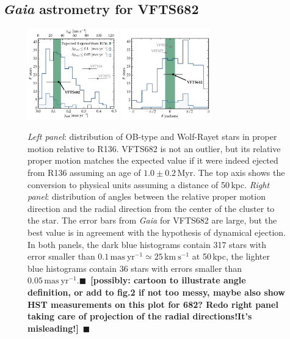 \documentclass[apjl,twocolumn]{emulateapj}
\newcommand{\todo}[1]{{\large $\blacksquare$~\textbf{\color{red}[#1]}}~$\blacksquare$}
\newcommand{\SdM}[1]{{{\color{brown}{#1}}}}
\begin{document}



\subsection{ \emph{Gaia} astrometry for VFTS682\label{data:gaia}}

\begin{figure}[htbp]
  \centering
  \includegraphics[width=0.35\textwidth]{figures/dist_mu_region.pdf}
  \includegraphics[width=0.35\textwidth]{figures/angle}
  \caption{\emph{Left panel}: distribution of OB-type and Wolf-Rayet stars in proper
    motion relative to R136. VFTS682 is not an outlier, but
    its relative proper motion matches the expected value if it were indeed
    ejected from R136 assuming an age of $1.0\pm0.2$\,Myr. The top axis shows the conversion to physical units
    assuming a distance of 50\,kpc. \emph{Right panel}:  distribution of
    angles between the relative proper motion direction and the radial
    direction from the center of the cluster to the star. The error bars from \emph{Gaia} for VFTS682 are large, but
    the best value is in agreement with the hypothesis of dynamical
    ejection. In both
    panels, the dark blue histograms contain 317 
    stars with error smaller than $0.1\,\mathrm{mas \
      yr^{-1}}\simeq25\,\mathrm{km\ s^{-1}}$ at 50\,kpc, the
    lighter blue histograms contain 36 stars with errors smaller than $0.05\,\mathrm{mas \
      yr^{-1}}$.\todo{possibly: cartoon to illustrate angle definition, or add to
    fig.2 if not too messy, maybe also show HST measurements on this
    plot for 682? Redo right panel taking care of projection of the
    radial directions!It's misleading!}}
  \label{fig:dist}
\end{figure}
\end{document}
